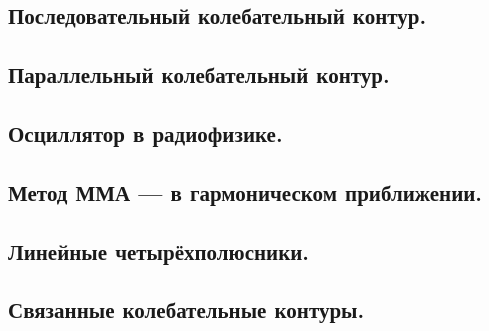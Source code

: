 \documentclass[../main/main.tex]{subfiles}
\begin{document}
\subsection{Последовательный колебательный контур.}

\subsection{Параллельный колебательный контур.}

\subsection{Осциллятор в радиофизике.}

\subsection{Метод ММА --- в гармоническом приближении.}

\subsection{Линейные четырёхполюсники.}

\subsection{Связанные колебательные контуры.}
\end{document}
